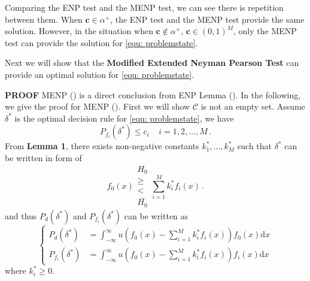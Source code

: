 Comparing the ENP test and the MENP test, we can see there is repetition between them. When $\mathbf{c} \in   \alpha^+$, the ENP test and the MENP test provide the same solution. However, in the situation when $\mathbf{c} \notin \alpha^+$, $\mathbf{c} \in (0, 1)^M$, only the MENP test can provide the solution for \eqref{equ: problemstate}. 

Next we will show that the \textbf{Modified Extended Neyman Pearson Test} can provide an optimal solution for \eqref{equ: problemstate}.

\textbf{PROOF}
MENP () is a direct conclusion from ENP Lemma (). In the following,  we give the proof for MENP (). First we will show $\mathcal{C}$ is not an empty set. 
Assume $\delta^\ast$ is the optimal decision rule for \eqref{equ: problemstate}, we have  
\begin{equation}
\label{condition 1}
P_{f_i}(\delta^\ast) \leq c_i\;\;\;\;i=1, 2, ..., M\,.
\end{equation}
From \textbf{Lemma 1}, there exists non-negative constants $k_1^\ast, ..., k_M^\ast$ such that $\delta^\ast$ can be written in form of 
\begin{equation}
f_0(x) \substack{H_0 \\ \geq \\ < \\ \bar{H_0}} \sum_{i=1}^{M}k_i^\ast f_i(x)\,.
\label{2015feb20a1}
\end{equation}
and thus $P_d(\delta^\ast)$ and $P_{f_i}(\delta^\ast)$ can be written as
\begin{equation}
\begin{cases}
\label{TEMP10}
P_{d}(\delta^\ast) &= \int_{-\infty}^{\infty} u(f_0(x) - \sum_{i=1}^{M}k_i^\ast f_i(x)) f_0(x) \mathrm{d}x\\
P_{f_i}(\delta^\ast) &= \int_{-\infty}^{\infty} u(f_0(x) - \sum_{i=1}^{M}k_i^\ast f_i(x)) f_i(x) \mathrm{d}x
\end{cases}
\end{equation}
where $k_i^\ast \geq 0$.

